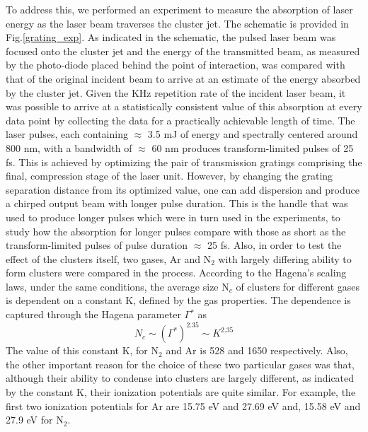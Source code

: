 \documentclass[a4paper,12pt]{article}
\begin{document}
To address this, we performed an experiment to measure the absorption of laser energy as the laser beam traverses the cluster jet. The schematic is provided in Fig.\ref{grating_exp}. As indicated in the schematic, the pulsed laser beam was focused onto the cluster jet and the energy of the transmitted beam, as measured by the photo-diode placed behind the point of interaction, was compared with that of the original incident beam to arrive at an estimate of the energy absorbed by the cluster jet. Given the KHz repetition rate of the incident laser beam, it was possible to arrive at a statistically consistent value of this absorption at every data point by collecting the data for a practically achievable length of time. 
The laser pulses, each containing $\approx$ 3.5 mJ of energy and spectrally centered around 800 nm, with a bandwidth of $\approx$ 60 nm produces transform-limited pulses of 25 fs. This is achieved by optimizing the pair of transmission gratings comprising the final, compression stage of the laser unit. However, by changing the grating separation distance from its optimized value, one can add dispersion and produce a chirped output beam with longer pulse duration. This is the handle that was used to produce longer pulses which were in turn used in the experiments, to study how the absorption for longer pulses compare with those as short as the transform-limited pulses of pulse duration $\approx$ 25 fs. Also, in order to test the effect of the clusters itself, two gases, Ar and N$_{2}$ with largely differing ability to form clusters were compared in the process. According to the Hagena's scaling laws, under the same conditions, the average size N$_{c}$ of clusters for different gases is dependent on a constant K, defined by the gas properties. The dependence is captured through the Hagena parameter $\Gamma$$^{*}$ as
\begin{equation}\label{eqn2}
N_{c} \sim (\Gamma^{*})^{2.35} \sim K^{2.35}
\end{equation}
The value of this constant K, for N$_{2}$ and Ar is 528 and 1650 respectively. Also, the other important reason for the choice of these two particular gases was that, although their ability to condense into clusters are largely different, as indicated by the constant K, their ionization potentials are quite similar. For example, the first two ionization potentials for Ar are 15.75 eV and 27.69 eV and, 15.58 eV and 27.9 eV for N$_{2}$\cite{crc}.
\end{document}
